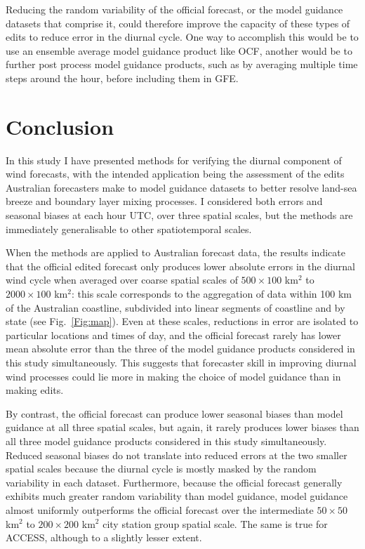 \documentclass[twocol]{ametsoc}
\begin{document}
Reducing the random variability of the official forecast, or the model guidance datasets that comprise it, could therefore improve the capacity of these types of edits to reduce error in the diurnal cycle. One way to accomplish this would be to use an ensemble average model guidance product like OCF, another would be to further post process model guidance products, such as by averaging multiple time steps around the hour, before including them in GFE.

\section{Conclusion}
\label{Sec:Conclusion}
In this study I have presented methods for verifying the diurnal component of wind forecasts, with the intended application being the assessment of the edits Australian forecasters make to model guidance datasets to better resolve land-sea breeze and boundary layer mixing processes. I considered both errors and seasonal biases at each hour UTC, over three spatial scales, but the methods are immediately generalisable to other spatiotemporal scales. 

When the methods are applied to Australian forecast data, the results indicate that the official edited forecast only produces lower absolute errors in the diurnal wind cycle when averaged over coarse spatial scales of $500\times 100$ km$^{2}$ to $2000 \times 100$ km$^{2}$: this scale corresponds to the aggregation of data within 100 km of the Australian coastline, subdivided into linear segments of coastline and by state (see Fig.~\ref{Fig:map}). Even at these scales, reductions in error are isolated to particular locations and times of day, and the official forecast rarely has lower mean absolute error than the three of the model guidance products considered in this study simultaneously. This suggests that forecaster skill in improving diurnal wind processes could lie more in making the choice of model guidance than in making edits.

By contrast, the official forecast can produce lower seasonal biases than model guidance at all three spatial scales, but again, it rarely produces lower biases than all three model guidance products considered in this study simultaneously. Reduced seasonal biases do not translate into reduced errors at the two smaller spatial scales because the diurnal cycle is mostly masked by the random variability in each dataset. Furthermore, because the official forecast generally exhibits much greater random variability than model guidance, model guidance almost uniformly outperforms the official forecast over the intermediate $50\times 50$ km$^{2}$ to $200 \times 200$ km$^{2}$ city station group spatial scale. The same is true for ACCESS, although to a slightly lesser extent.
\end{document}

